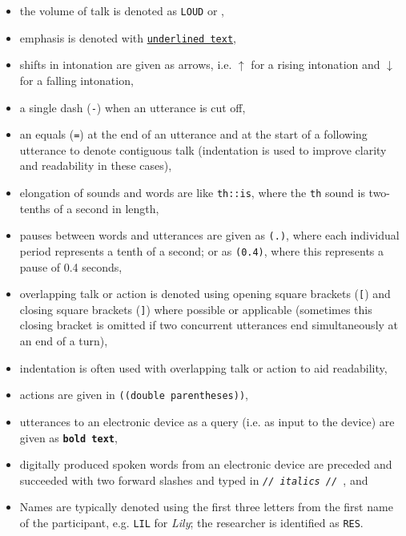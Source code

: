 \begin{itemize}
\item the volume of talk is denoted as \texttt{LOUD} or \texttt{\degree},
\item emphasis is denoted with \texttt{\underline{underlined text}},
\item shifts in intonation are given as arrows, i.e. \texttt{$\uparrow$} for a rising intonation and \texttt{$\downarrow$} for a falling intonation,
\item a single dash (\texttt{-}) when an utterance is cut off,
\item an equals (\texttt{=}) at the end of an utterance and at the start of a following utterance to denote contiguous talk (indentation is used to improve clarity and readability in these cases),
\item elongation of sounds and words are like \texttt{th::is}, where the \texttt{th} sound is two-tenths of a second in length,
\item pauses between words and utterances are given as \texttt{(.)}, where each individual period represents a tenth of a second; or as \texttt{(0.4)}, where this represents a pause of 0.4 seconds,
\item overlapping talk or action is denoted using opening square brackets (\texttt{[}) and closing square brackets (\texttt{]}) where possible or applicable (sometimes this closing bracket is omitted if two concurrent utterances end simultaneously at an end of a turn),
\item indentation is often used with overlapping talk or action to aid readability,
\item actions are given in \texttt{((double parentheses))},
\item utterances to an electronic device as a query (i.e. as input to the device) are given as \texttt{\textbf{bold text}},
\item digitally produced spoken words from an electronic device are preceded and succeeded with two forward slashes and typed in \texttt{\textit{// italics // }}, and
\item Names are typically denoted using the first three letters from the first name of the participant, e.g. \texttt{LIL} for \textit{Lily}; the researcher is identified as \texttt{RES}.
\end{itemize}



